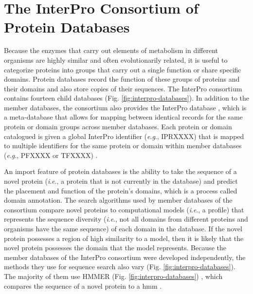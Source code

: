 \section{The InterPro Consortium of Protein Databases} \label{InterProDatabases}

Because the enzymes that carry out elements of metabolism in different organisms 
are highly similar and often evolutionarily related, it is useful to categorize 
proteins into groups that carry out a single function or share specific domains. 
Protein databases record the function of these groups of proteins and their 
domains and also store copies of their sequences. The InterPro consortium 
\cite{apweiler2000interpro,hunter2008interpro,Hunter2009} contains fourteen 
child databases \cite{finn2016interpro,Hunter2009} (Fig. 
\ref{fig:interpro-databases}). In addition to the member databases, the 
consortium also provides the InterPro database 
\cite{hunter2008interpro,finn2016interpro}, which is a meta-database that allows 
for mapping between identical records for the same protein or domain groups 
across member databases. Each protein or domain catalogued is given a global 
InterPro identifier (\textit{e}.\textit{g}., IPRXXXX) that is mapped to multiple identifiers for 
the same protein or domain within member databases (\textit{e}.\textit{g}., PFXXXX or TFXXXX) 
\cite{hunter2008interpro,finn2016interpro}.

An import feature of protein databases is the ability to take the sequence of a 
novel protein (\textit{i}.\textit{e}., a protein that is not currently in the database) and 
predict the placement and function of the protein's domains, which is a process called 
domain annotation. The search algorithms used by member databases of the 
consortium compare novel proteins to computational models (\textit{i}.\textit{e}., a profile) that 
represents the sequence diversity (\textit{i}.\textit{e}., not all domains from different proteins 
and organisms have the same sequence) of each domain in the database. If the 
novel protein possesses a region of high similarity to a model, then it is 
likely that the novel protein possesses the domain that the model represents. 
Because the member databases of the InterPro consortium were developed 
independently, the methods they use for sequence search also vary (Fig. 
\ref{fig:interpro-databases}). The majority of them use HMMER (Fig. 
\ref{fig:interpro-databases}) \cite{eddy2011accelerated}, which compares the 
sequence of a novel protein to a \gls{hmm} \cite{de2007hidden}.

